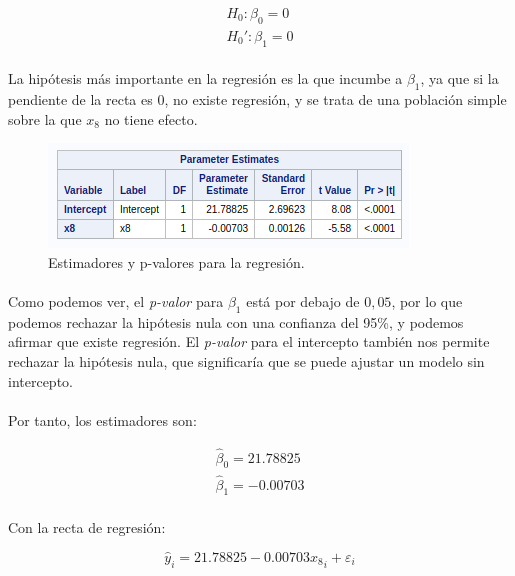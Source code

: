 \documentclass{article}
\begin{document}
    \begin{align}
      H_0: \beta_0 = 0\\
      H_0': \beta_1 = 0
      \label{mont:hipotesisnulas}
    \end{align}

  \paragraph{}
  La hipótesis más importante en la regresión es la que incumbe a $\beta_1$, ya que si la pendiente de la recta es 0, no existe regresión, y se trata de una población simple sobre la que $x_8$ no tiene efecto.

  \begin{figure}[H]
    \centering
    \includegraphics[width=.5\textwidth]{img/montgomery/procreg.png}
    \caption{Estimadores y p-valores para la regresión.}
    \label{img:mont-procreg}
  \end{figure}

  \paragraph{}
  Como podemos ver, el \textit{p-valor} para $\beta_1$ está por debajo de $0,05$, por lo que podemos rechazar la hipótesis nula con una confianza del 95\%, y podemos afirmar que existe regresión. El \textit{p-valor} para el intercepto también nos permite rechazar la hipótesis nula, que significaría que se puede ajustar un modelo sin intercepto.

  \paragraph{}
  Por tanto, los estimadores son:

  \begin{align}
    \hat\beta_0 = 21.78825\\
    \hat\beta_1 = -0.00703
  \end{align}

  \paragraph{}
  Con la recta de regresión:

  \begin{equation}
    \hat y_i = 21.78825 -0.00703{x_8}_i + \varepsilon_i
  \end{equation}
\end{document}
